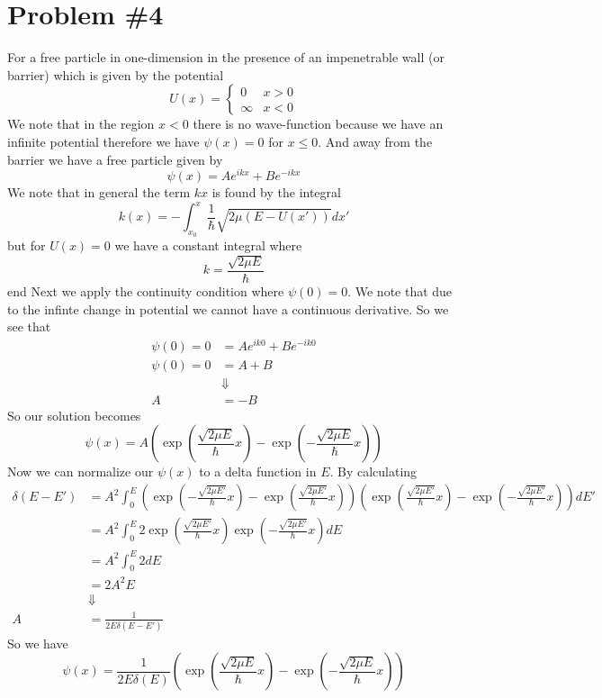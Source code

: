 \documentclass[11pt]{article}
\numberwithin{equation}{section}
\begin{document}
\pagebreak

\section{Problem \#4}
For a free particle in one-dimension in the presence of an impenetrable wall (or barrier) 
which is given by the potential
$$U(x) = \left\{\begin{array}{cl}
                  0       &x>0\\ 
                  \infty  &x<0
          \end{array}\right.$$
We note that in the region $x<0$ there is no wave-function because we have an infinite 
potential therefore we have $\psi(x)=0$ for $x\le0$. And away from the barrier we have a free
particle given by
$$\psi(x) = Ae^{ikx} + Be^{-ikx}$$
We note that in general the term $kx$ is found by the integral
$$k(x) = -\int_{x_0}^{x}\frac{1}{\hbar}\sqrt{2\mu(E-U(x'))}dx'$$
but for $U(x)=0$ we have a constant integral where 
$$k = \frac{\sqrt{2\mu{E}}}{\hbar}$$
end
Next we apply the continuity condition where $\psi(0) = 0$. We note that due to the infinte
change in potential we cannot have a continuous derivative. So we see that
\begin{align*}
\psi(0) = 0 &= Ae^{ik0} + Be^{-ik0}\\
\psi(0) = 0 &= A + B\\
&\Downarrow\\
A &= -B
\end{align*}
So our solution becomes
$$\psi(x) = A\left(\exp\left(\frac{\sqrt{2\mu{E}}}{\hbar}x\right) - \exp\left(-\frac{\sqrt{2\mu{E}}}{\hbar}x\right)\right)$$
Now we can normalize our $\psi(x)$ to a delta function in $E$. By calculating 
\begin{align*}
\delta(E-E') &= A^2\int_{0}^{E}\left(\exp\left(-\frac{\sqrt{2\mu{E'}}}{\hbar}x\right) - \exp\left(\frac{\sqrt{2\mu{E'}}}{\hbar}x\right)\right)\left(\exp\left(\frac{\sqrt{2\mu{E'}}}{\hbar}x\right) - \exp\left(-\frac{\sqrt{2\mu{E'}}}{\hbar}x\right)\right)dE'\\
&= A^2\int_{0}^{E}2\exp\left(\frac{\sqrt{2\mu{E'}}}{\hbar}x\right)\exp\left(-\frac{\sqrt{2\mu{E'}}}{\hbar}x\right)dE\\
&= A^2\int_{0}^{E}2dE\\
&= 2A^2E\\
&\Downarrow\\
A &= \frac{1}{2E\delta(E-E')}
\end{align*}
So we have
$$\psi(x) = \frac{1}{2E\delta(E)}\left(\exp\left(\frac{\sqrt{2\mu{E}}}{\hbar}x\right) - \exp\left(-\frac{\sqrt{2\mu{E}}}{\hbar}x\right)\right)$$
\end{document}
